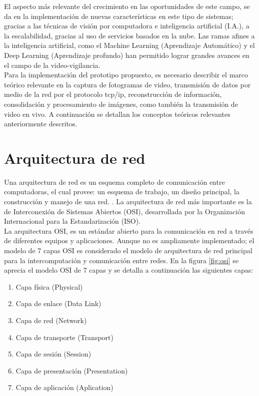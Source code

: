 El aspecto más relevante del crecimiento en las oportunidades de este campo, se da en la implementación de nuevas características en este tipo de sistemas; gracias a las técnicas de visión por computadora e inteligencia artificial (I.A.), a la escalabilidad, gracias al uso de servicios basados en la nube. Las ramas afines a la inteligencia artificial, como el Machine Learning (Aprendizaje Automático) y el Deep Learning (Aprendizaje profundo) han permitido lograr grandes avances en el campo de la video-vigilancia.\\

Para la implementación del prototipo propuesto, es necesario describir el marco teórico relevante en la captura de fotogramas de video, transmisión de datos por medio de la red por el protocolo tcp/ip, reconstrucción de información, consolidación y procesamiento de imágenes, como también la transmisión de video en vivo. A continuación se detallan los conceptos teóricos relevantes anteriormente descritos.\\

\section{Arquitectura de red}
Una arquitectura de red es un esquema completo de comunicación entre computadoras, el cual provee: un esquema de trabajo, un diseño principal, la construcción y manejo de una red. \cite[1]{networkProtocolos:handbook}. La arquitectura de red más importante es la de Interconexión de Sistemas Abiertos (OSI), desarrollada por la Organización Internacional para la Estandarización (ISO).\\

La arquitectura OSI, es un estándar abierto para la comunicación en red a través de diferentes equipos y aplicaciones. Aunque no es ampliamente implementado; el modelo de 7 capas OSI es considerado el modelo de arquitectura de red principal para la intercomputación y comunicación entre redes. En la figura \ref{fig:osi} se aprecia el modelo OSI de 7 capas y se detalla a continuación las siguientes capas:

\begin{enumerate}
    \item Capa física (Physical)
    \item Capa de enlace (Data Link)
    \item Capa de red (Network)
    \item Capa de transporte (Transport)
    \item Capa de sesión (Session)
    \item Capa de presentación (Presentation)
    \item Capa de aplicación (Aplication)
\end{enumerate}


